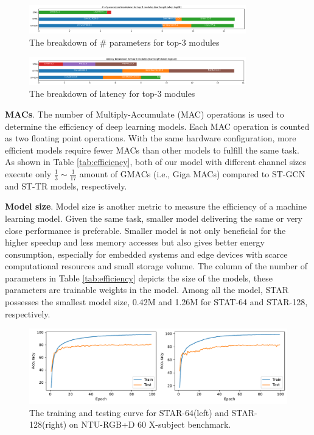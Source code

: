 \documentclass[letterpaper]{article} %
\begin{document}
\begin{figure}[h!]
    \centering
    \includegraphics[width=0.84\textwidth]{params_breakdown.pdf}
    \caption{The breakdown of \# parameters for top-3 modules} \label{fig:param_breakdown}
\end{figure}

\begin{figure}[h!]
    \centering
    \includegraphics[width=0.84\textwidth]{latency_breakdown.pdf}
    \caption{The breakdown of latency for top-3 modules}
    \label{fig:latency_breakdown}
\end{figure}

\textbf{MACs}. The number of Multiply-Accumulate (MAC) operations is used to determine the efficiency of deep learning models. Each MAC operation is counted as two floating point operations. With the same hardware configuration, more efficient models require fewer MACs than other models to fulfill the same task. As shown in Table \ref{tab:efficiency}, both of our model with different channel sizes execute only $\frac{1}{3} \sim \frac{1}{17}$ amount of GMACs (i.e., Giga MACs) compared to ST-GCN and ST-TR models, respectively.

\textbf{Model size}. Model size is another metric to measure the efficiency of a machine learning model. Given the same task, smaller model delivering the same or very close performance is preferable. Smaller model is not only beneficial for the higher speedup and less memory accesses but also gives better energy consumption, especially for embedded systems and edge devices with scarce computational resources and small storage volume. The column of the number of parameters in Table \ref{tab:efficiency} depicts the size of the models, these parameters are trainable weights in the model. Among all the model, STAR possesses the smallest model size,  0.42M and 1.26M for STAT-64 and STAR-128, respectively.

\begin{figure}[h!]
    \centering
    \includegraphics[width=.76\textwidth]{graph.pdf}
    \caption{The training and testing curve for STAR-64(left) and STAR-128(right) on NTU-RGB+D 60 X-subject benchmark.}
    \label{fig:general}
\end{figure}
\end{document}
